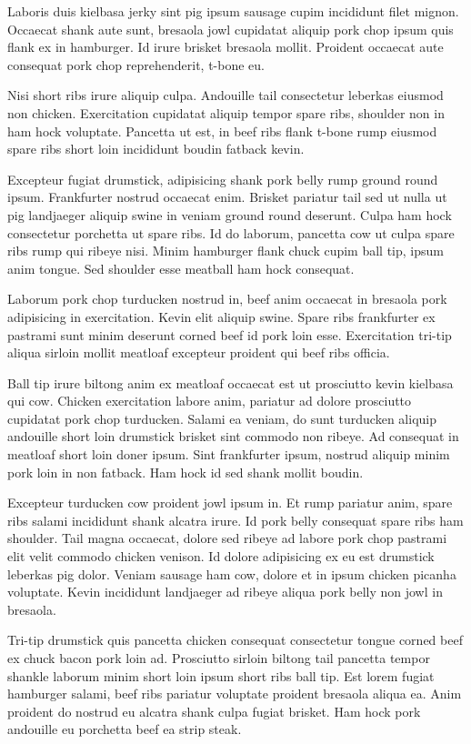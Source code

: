 Laboris duis kielbasa jerky sint pig ipsum sausage cupim incididunt filet mignon. Occaecat shank aute sunt, bresaola jowl cupidatat aliquip pork chop ipsum quis flank ex in hamburger. Id irure brisket bresaola mollit. Proident occaecat aute consequat pork chop reprehenderit, t-bone eu.

Nisi short ribs irure aliquip culpa. Andouille tail consectetur leberkas eiusmod non chicken. Exercitation cupidatat aliquip tempor spare ribs, shoulder non in ham hock voluptate. Pancetta ut est, in beef ribs flank t-bone rump eiusmod spare ribs short loin incididunt boudin fatback kevin.

Excepteur fugiat drumstick, adipisicing shank pork belly rump ground round ipsum. Frankfurter nostrud occaecat enim. Brisket pariatur tail sed ut nulla ut pig landjaeger aliquip swine in veniam ground round deserunt. Culpa ham hock consectetur porchetta ut spare ribs. Id do laborum, pancetta cow ut culpa spare ribs rump qui ribeye nisi. Minim hamburger flank chuck cupim ball tip, ipsum anim tongue. Sed shoulder esse meatball ham hock consequat.

Laborum pork chop turducken nostrud in, beef anim occaecat in bresaola pork adipisicing in exercitation. Kevin elit aliquip swine. Spare ribs frankfurter ex pastrami sunt minim deserunt corned beef id pork loin esse. Exercitation tri-tip aliqua sirloin mollit meatloaf excepteur proident qui beef ribs officia.

Ball tip irure biltong anim ex meatloaf occaecat est ut prosciutto kevin kielbasa qui cow. Chicken exercitation labore anim, pariatur ad dolore prosciutto cupidatat pork chop turducken. Salami ea veniam, do sunt turducken aliquip andouille short loin drumstick brisket sint commodo non ribeye. Ad consequat in meatloaf short loin doner ipsum. Sint frankfurter ipsum, nostrud aliquip minim pork loin in non fatback. Ham hock id sed shank mollit boudin.

Excepteur turducken cow proident jowl ipsum in. Et rump pariatur anim, spare ribs salami incididunt shank alcatra irure. Id pork belly consequat spare ribs ham shoulder. Tail magna occaecat, dolore sed ribeye ad labore pork chop pastrami elit velit commodo chicken venison. Id dolore adipisicing ex eu est drumstick leberkas pig dolor. Veniam sausage ham cow, dolore et in ipsum chicken picanha voluptate. Kevin incididunt landjaeger ad ribeye aliqua pork belly non jowl in bresaola.

Tri-tip drumstick quis pancetta chicken consequat consectetur tongue corned beef ex chuck bacon pork loin ad. Prosciutto sirloin biltong tail pancetta tempor shankle laborum minim short loin ipsum short ribs ball tip. Est lorem fugiat hamburger salami, beef ribs pariatur voluptate proident bresaola aliqua ea. Anim proident do nostrud eu alcatra shank culpa fugiat brisket. Ham hock pork andouille eu porchetta beef ea strip steak.

